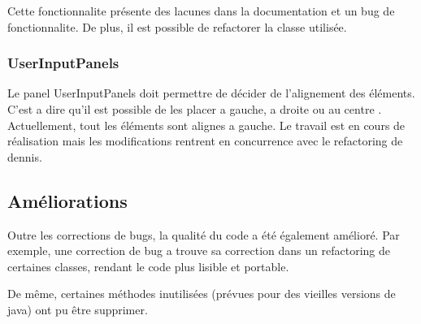 Cette fonctionnalite présente des lacunes dans la documentation \cite{IZPACK-224} et un bug de fonctionnalite\cite{IZPACK-281}. De plus, il est possible de refactorer la classe utilisée\cite{IZPACK-307}.
\subsubsection{UserInputPanels}
Le panel UserInputPanels doit permettre de décider de l'alignement des éléments. C'est a dire qu'il est possible de les placer a gauche, a droite ou au centre \cite{IZPACK-176}. Actuellement, tout les éléments sont alignes a gauche. Le travail est en cours de réalisation mais les modifications rentrent en concurrence avec le refactoring de dennis.


\subsection{Améliorations}
Outre les corrections de bugs, la qualité du code a été également amélioré. Par exemple, une correction de bug \cite{IZPACK-3xx} a trouve sa correction dans un refactoring de certaines classes, rendant le code plus lisible et portable.

De même, certaines méthodes inutilisées \cite{IZPACK-3xx} (prévues pour des vieilles versions de java) ont pu être supprimer.